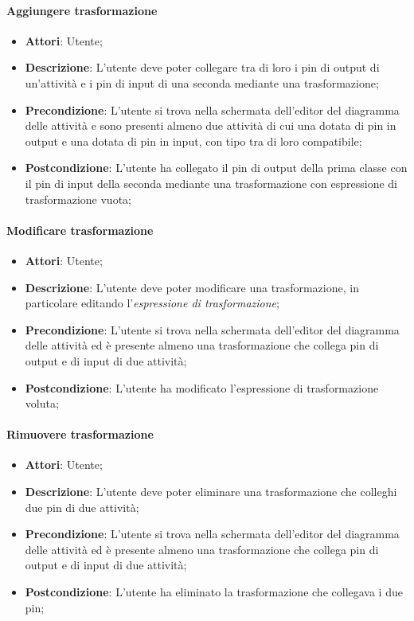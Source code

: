 \paragraph{Aggiungere trasformazione}
\begin{itemize}
	\item \textbf{Attori}: Utente;
	\item \textbf{Descrizione}: L’utente deve poter collegare tra di loro i pin di output di un’attività e i pin di input di una seconda mediante una trasformazione;
	\item \textbf{Precondizione}: L’utente si trova nella schermata dell’editor del diagramma delle attività e sono presenti almeno due attività di cui una dotata di pin in output e una dotata di pin in input, con tipo tra di loro compatibile;
	\item \textbf{Postcondizione}: L’utente ha collegato il pin di output della prima classe con il pin di input della seconda mediante una trasformazione con espressione di trasformazione vuota;
\end{itemize}

\paragraph{Modificare trasformazione}
\begin{itemize}
	\item \textbf{Attori}: Utente;
	\item \textbf{Descrizione}: L’utente deve poter modificare una trasformazione, in particolare editando l’\textit{espressione di trasformazione};
	\item \textbf{Precondizione}: L’utente si trova nella schermata dell’editor del diagramma delle attività ed è presente almeno una trasformazione che collega pin di output e di input di due attività;
	\item \textbf{Postcondizione}: L’utente ha modificato l’espressione di trasformazione voluta;
\end{itemize}

\paragraph{Rimuovere trasformazione}
\begin{itemize}
	\item \textbf{Attori}: Utente;
	\item \textbf{Descrizione}: L’utente deve poter eliminare una trasformazione che colleghi due pin di due attività;
	\item \textbf{Precondizione}: L’utente si trova nella schermata dell’editor del diagramma delle attività ed è presente almeno una trasformazione che collega pin di output e di input di due attività;
	\item \textbf{Postcondizione}: L’utente ha eliminato la trasformazione che collegava i due pin;
\end{itemize}

